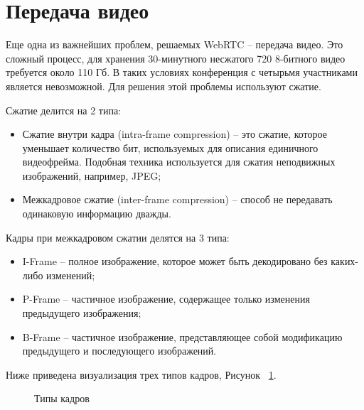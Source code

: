 \section{Передача видео}

Еще одна из важнейших проблем, решаемых WebRTC -- передача видео. Это сложный процесс, для хранения 30-минутного несжатого 720 8-битного видео требуется около 110 Гб. В таких условиях конференция с четырьмя участниками является невозможной. Для решения этой проблемы используют сжатие.

Сжатие делится на 2 типа:
\begin{itemize}
	\item[1.] Сжатие внутри кадра (intra-frame compression) -- это сжатие, которое уменьшает количество бит, используемых для описания единичного видеофрейма. Подобная техника используется для сжатия неподвижных изображений, например, JPEG;
	\item[2.] Межкадровое сжатие (inter-frame compression) -- способ не передавать одинаковую информацию дважды.
\end{itemize}

Кадры при межкадровом сжатии делятся на 3 типа:
\begin{itemize}
	\item[--] I-Frame -- полное изображение, которое может быть декодировано без каких-либо изменений;
	\item[--] P-Frame -- частичное изображение, содержащее только изменения предыдущего изображения;
        \item[--] B-Frame -- частичное изображение, представляющее собой модификацию предыдущего и последующего изображений.
\end{itemize}

Ниже приведена визуализация трех типов кадров, Рисунок ~\ref{frame-types}.

\begin{figure}[ht]
\begin{center}

\caption{
\label{frame-types}
     Типы кадров}
\end {center}
\end {figure}

